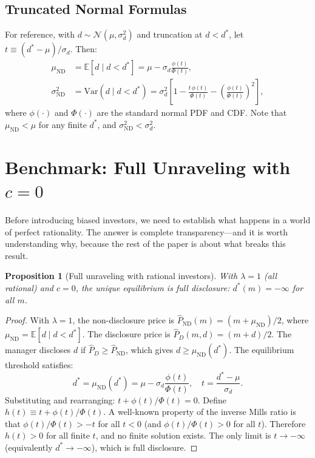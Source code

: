 \documentclass[12pt]{article}
\theoremstyle{plain}
\newtheorem{proposition}{Proposition}
\theoremstyle{definition}
\newcommand{\E}{\mathbb{E}}
\newcommand{\Var}{\mathrm{Var}}
\newcommand{\ND}{\mathrm{ND}}
\begin{document}
\subsection{Truncated Normal Formulas}
\label{sec:truncated}

For reference, with $d \sim \mathcal{N}(\mu, \sigma_d^2)$ and truncation at $d < d^*$, let $t \equiv (d^* - \mu)/\sigma_d$. Then:
\begin{align}
\mu_{\ND} &= \E[d \mid d < d^*] = \mu - \sigma_d \frac{\phi(t)}{\Phi(t)}, \label{eq:mu_nd} \\
\sigma_{\ND}^2 &= \Var(d \mid d < d^*) = \sigma_d^2 \left[1 - \frac{t\,\phi(t)}{\Phi(t)} - \left(\frac{\phi(t)}{\Phi(t)}\right)^2\right], \label{eq:var_nd}
\end{align}
where $\phi(\cdot)$ and $\Phi(\cdot)$ are the standard normal PDF and CDF. Note that $\mu_{\ND} < \mu$ for any finite $d^*$, and $\sigma_{\ND}^2 < \sigma_d^2$.


\section{Benchmark: Full Unraveling with $c = 0$}
\label{sec:unraveling}

Before introducing biased investors, we need to establish what happens in a world of perfect rationality. The answer is complete transparency---and it is worth understanding why, because the rest of the paper is about what breaks this result.

\begin{proposition}[Full unraveling with rational investors]
\label{prop:unraveling}
With $\lambda = 1$ (all rational) and $c = 0$, the unique equilibrium is full disclosure: $d^*(m) = -\infty$ for all $m$.
\end{proposition}

\begin{proof}
With $\lambda = 1$, the non-disclosure price is $\hat{P}_{\ND}(m) = (m + \mu_{\ND})/2$, where $\mu_{\ND} = \E[d \mid d < d^*]$. The disclosure price is $\hat{P}_D(m, d) = (m + d)/2$. The manager discloses $d$ if $\hat{P}_D \geq \hat{P}_{\ND}$, which gives $d \geq \mu_{\ND}(d^*)$. The equilibrium threshold satisfies:
\[
d^* = \mu_{\ND}(d^*) = \mu - \sigma_d \frac{\phi(t)}{\Phi(t)}, \quad t = \frac{d^* - \mu}{\sigma_d}.
\]
Substituting and rearranging: $t + \phi(t)/\Phi(t) = 0$. Define $h(t) \equiv t + \phi(t)/\Phi(t)$. A well-known property of the inverse Mills ratio is that $\phi(t)/\Phi(t) > -t$ for all $t < 0$ (and $\phi(t)/\Phi(t) > 0$ for all $t$). Therefore $h(t) > 0$ for all finite $t$, and no finite solution exists. The only limit is $t \to -\infty$ (equivalently $d^* \to -\infty$), which is full disclosure.
\end{proof}
\end{document}
